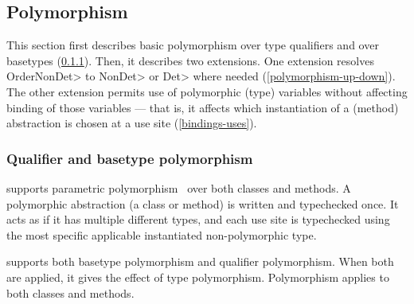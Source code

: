 \subsection{Polymorphism}\label{polymorphism}

This section first describes basic polymorphism over type qualifiers and
over basetypes (\cref{sec:basic-polymorphism}).  Then, it describes two
extensions.
One extension resolves \<OrderNonDet> to \<NonDet> or \<Det> where
needed (\cref{polymorphism-up-down}).
The other extension permits use of polymorphic (type) variables without
affecting binding of those variables --- that is, it affects which
instantiation of a (method) abstraction is chosen at a use site
(\cref{bindings-uses}).



\subsubsection{Qualifier and basetype polymorphism}\label{sec:basic-polymorphism}

\OurTypeSystem supports parametric
polymorphism~\cite{Abadi:1989:FIM:77350.77373,Plotkin:1993:LPP:645891.671433}
over both classes and methods.
A polymorphic abstraction (a class or method) is written and
typechecked once.
It acts as if it has multiple different types, and each use site is
typechecked using the most specific applicable instantiated
non-polymorphic type.



\OurTypeSystem supports both basetype polymorphism and qualifier polymorphism.
When both are applied, it gives the effect of type polymorphism.
Polymorphism applies to both classes and methods.

